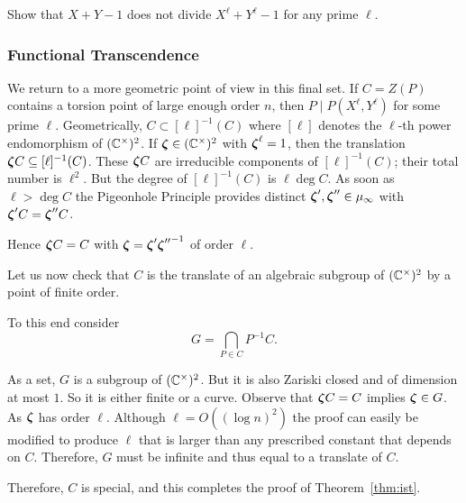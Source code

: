 \begin{exercise}
  Show that $X+Y-1$ does not divide  $X^\ell + Y^\ell-1$ for any prime
  $\ell$. 
\end{exercise}

\subsubsection{Functional Transcendence}
\label{subsub:functrans}

We return to a more geometric point of view in this final set.
If $C=Z(P)$ contains a torsion point of large enough order $n$, then
$P \mid P(X^\ell,Y^\ell)$ for some prime $\ell$.
Geometrically, $C \subset [\ell]^{-1}(C)$ where $[\ell]$ denotes the $\ell$-th
power endomorphism of $({\mathbb{C}}^\times)^2$.
If ${\boldsymbol{\zeta}}\in ({\mathbb{C}}^\times)^2$ with ${\boldsymbol{\zeta}}^\ell=1$, then the
translation ${\boldsymbol{\zeta}} C\subseteq [\ell]^{-1}(C)$. These ${\boldsymbol{\zeta}} C$ are
irreducible components of $[\ell]^{-1}(C)$; their total number is
$\ell^2$. But the degree of $[\ell]^{-1}(C)$ is $\ell \deg C$. As soon
as $\ell > \deg C$ the Pigeonhole Principle provides distinct
${\boldsymbol{\zeta}}',{\boldsymbol{\zeta}}''\in \mu_\infty$ with ${\boldsymbol{\zeta}}' C = {\boldsymbol{\zeta}}''C$.

Hence ${\boldsymbol{\zeta}} C=C$ with ${\boldsymbol{\zeta}} = {\boldsymbol{\zeta}}'{{\boldsymbol{\zeta}}''}^{-1}$ of order
$\ell$.

Let us now check that $C$ is the translate of an algebraic subgroup of
$({\mathbb{C}}^\times)^2$ by a point of finite order. %

To this end consider
\begin{equation*}
  G = \bigcap_{P\in C} P^{-1} C.
\end{equation*}

As a set, $G$ is a subgroup of $({\mathbb{C}}^\times)^2$. But it is also Zariski
closed and of dimension at most $1$. So it is either finite or a
curve. Observe that ${\boldsymbol{\zeta}} C = C$ implies ${\boldsymbol{\zeta}}\in G$. As
${\boldsymbol{\zeta}}$ has order $\ell$. Although $\ell = O((\log n)^2)$ the proof
can easily be modified to produce $\ell$ that is larger than any
prescribed constant that depends on $C$. Therefore, $G$ must be
infinite and thus equal to a translate of $C$.

Therefore, $C$ is special, and this completes the proof of
Theorem~\ref{thm:ist}.




